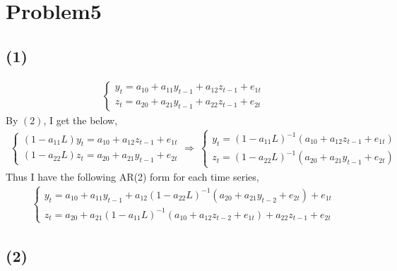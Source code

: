 \documentclass{article}
\begin{document}
\section{Problem5}
\subsection{(1)}
\begin{align}
	\begin{cases}
	y_t = a_{10} + a_{11}y_{t-1} + a_{12}z_{t-1} + e_{1t}\\
	z_t = a_{20} + a_{21}y_{t-1} + a_{22}z_{t-1} + e_{2t}
	\end{cases}
\end{align}
By $(2)$, I get the below,
\begin{align}
	\begin{cases}
	(1-a_{11}L)y_t = a_{10} + a_{12}z_{t-1} + e_{1t}\\
	(1-a_{22}L)z_t = a_{20} + a_{21}y_{t-1} + e_{2t}
	\end{cases}
	\Rightarrow\ 
	\begin{cases}
	y_t = (1-a_{11}L)^{-1} \left( a_{10} + a_{12}z_{t-1} + e_{1t} \right)\\
	z_t = (1-a_{22}L)^{-1} \left( a_{20} + a_{21}y_{t-1} + e_{2t} \right)
	\end{cases}
\end{align}
Thus I have the following AR(2) form for each time series,
\begin{align}
	\begin{cases}
	y_t = a_{10} + a_{11}y_{t-1} + a_{12} (1-a_{22}L)^{-1} \left( a_{20} + a_{21}y_{t-2} + e_{2t} \right) + e_{1t}\\
	z_t = a_{20} + a_{21} (1-a_{11}L)^{-1} \left( a_{10} + a_{12}z_{t-2} + e_{1t} \right) + a_{22}z_{t-1} + e_{2t}
	\end{cases}
\end{align}

\subsection{(2)}
\end{document}
